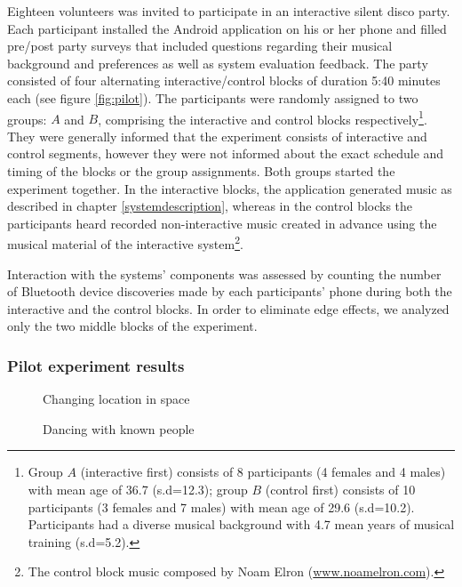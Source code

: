 \documentclass[a4paper,11pt]{article}
\begin{document}
{Eighteen volunteers was invited to participate in an interactive silent disco party.
Each participant installed the Android application on his or her phone and filled pre/post party surveys that included questions regarding their musical background and preferences as well as system evaluation feedback.
The party consisted of four alternating interactive/control blocks of duration 5:40 minutes each (see figure \ref{fig:pilot}).
The participants were randomly assigned to two groups: $A$ and $B$, comprising the interactive and control blocks respectively\footnote{Group $A$ (interactive first) consists of 8 participants (4 females and 4 males) with mean age of 36.7 (s.d=12.3); group $B$ (control first) consists of 10 participants (3 females and 7 males) with mean age of 29.6 (s.d=10.2). Participants had a diverse musical background with 4.7 mean years of musical training (s.d=5.2).}.
They were generally informed that the experiment consists of interactive and control segments, however they were not informed about the exact schedule and timing of the blocks or the group assignments.
Both groups started the experiment together.
In the interactive blocks, the application generated music as described in chapter \ref{systemdescription}, whereas in the control blocks the participants heard recorded non-interactive music created in advance using the musical material of the interactive system\footnote{The control block music composed by Noam Elron (\href{http://www.noamelron.com}{www.noamelron.com}).}.

Interaction with the systems' components was assessed by counting the number of Bluetooth device discoveries made by each participants' phone during both the interactive and the control blocks.
In order to eliminate edge effects, we analyzed only the two middle blocks of the experiment.

\subsubsection{Pilot experiment results}

\begin{figure}[!htb]
	\def\svgwidth{0.95\columnwidth}
  	
	\caption{Changing location in space}\label{fig:location}
\endminipage\hfill
{}
	\def\svgwidth{0.95\columnwidth}
	
	\caption{Dancing with known people}\label{fig:known}
\endminipage\hfill
\end{figure}

}
\end{document}
